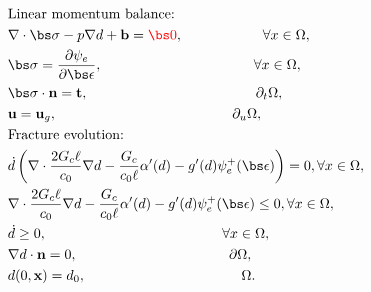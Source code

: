 \begin{mdframed}[
  frametitle={Strong form},
  frametitlebackgroundcolor=gray!20,
  backgroundcolor=gray!5,
  linewidth=0pt,
  nobreak=true
  ]
  \vspace{-1em}
  \begin{align}
    &\text{Linear momentum balance: }\nonumber \\ & \nabla \cdot \bs\sigma -p\nabla d + \textbf{b} = {\color{red} \bs 0},                       \hspace{2cm} \forall x \in \Omega, \\ 
                                     & \bs\sigma = \frac{\partial\psi_e}{\partial \bs\epsilon},   \hspace{3.8cm}                 \forall x \in \Omega, \\
                                     & \bs\sigma\cdot \textbf{n} = \textbf{t},                             \hspace{4.2cm}              \partial_t\Omega,  
                                     \\
                                     & \textbf{u} = \textbf{u}_g,                                                  \hspace{4.4cm}     \partial_u\Omega ,                \\
    &\text{Fracture evolution: }\nonumber \\      
    & \dot d\left(\nabla\cdot\frac{2G_c\ell}{c_0}\nabla d - \frac{G_c}{c_0\ell}\alpha'(d) - g'(d)\psi_e^+ (\bs\epsilon)\right) = 0,                                        \forall x \in \Omega,           \\
    & \nabla \cdot \frac{2G_c\ell}{c_0}\nabla d - \frac{G_c}{c_0\ell}\alpha'(d) - g'(d)\psi_e^+ (\bs\epsilon) \le 0,                                         \forall x \in \Omega,  \label{damage ineq}         \\
                                     & \dot d \ge  0,                                     \hspace{4.4cm}     \forall x \in \Omega, \\
                                     & \nabla d\cdot\textbf{n} = 0,                      \hspace{3.8cm}       \partial\Omega, \\
                                         & d(0,\textbf{x}) = d_0,                         \hspace{3.9cm}           \Omega.                                  
    \end{align}
\end{mdframed}

